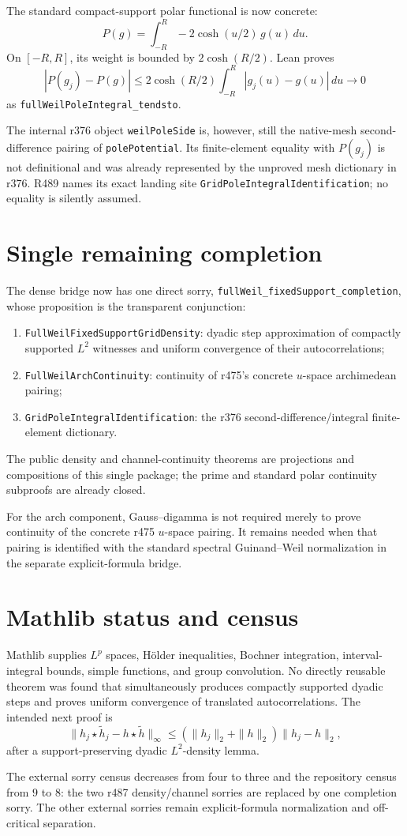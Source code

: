 \documentclass[11pt]{article}
\newcommand{\code}[1]{\nolinkurl{#1}}
\begin{document}
The standard compact-support polar functional is now concrete:
\[
 P(g)=\int_{-R}^{R}-2\cosh(u/2)\,g(u)\,du .
\]
On \([-R,R]\), its weight is bounded by
\(2\cosh(R/2)\).  Lean proves
\[
 |P(g_j)-P(g)|\le
 2\cosh(R/2)\int_{-R}^{R}|g_j(u)-g(u)|\,du
 \longrightarrow0
\]
as \code{fullWeilPoleIntegral_tendsto}.

The internal r376 object \code{weilPoleSide} is, however, still the
native-mesh second-difference pairing of \code{polePotential}.  Its
finite-element equality with \(P(g_j)\) is not definitional and was
already represented by the unproved mesh dictionary in r376.  R489
names its exact landing site
\code{GridPoleIntegralIdentification}; no equality is silently assumed.

\section{Single remaining completion}

The dense bridge now has one direct sorry,
\code{fullWeil_fixedSupport_completion}, whose proposition is the
transparent conjunction:
\begin{enumerate}
\item \code{FullWeilFixedSupportGridDensity}: dyadic step approximation
of compactly supported \(L^2\) witnesses and uniform convergence of
their autocorrelations;
\item \code{FullWeilArchContinuity}: continuity of r475's concrete
\(u\)-space archimedean pairing;
\item \code{GridPoleIntegralIdentification}: the r376
second-difference/integral finite-element dictionary.
\end{enumerate}
The public density and channel-continuity theorems are projections and
compositions of this single package; the prime and standard polar
continuity subproofs are already closed.

For the arch component, Gauss--digamma is not required merely to prove
continuity of the concrete r475 \(u\)-space pairing.  It remains needed
when that pairing is identified with the standard spectral
Guinand--Weil normalization in the separate explicit-formula bridge.

\section{Mathlib status and census}

Mathlib supplies \(L^p\) spaces, Hölder inequalities, Bochner
integration, interval-integral bounds, simple functions, and group
convolution.  No directly reusable theorem was found that simultaneously
produces compactly supported dyadic steps and proves uniform convergence
of translated autocorrelations.  The intended next proof is
\[
\|h_j\star\widetilde h_j-h\star\widetilde h\|_\infty
\le(\|h_j\|_2+\|h\|_2)\|h_j-h\|_2,
\]
after a support-preserving dyadic \(L^2\)-density lemma.

The external sorry census decreases from four to three and the
repository census from \(9\) to \(8\): the two r487 density/channel
sorries are replaced by one completion sorry.  The other external
sorries remain explicit-formula normalization and off-critical
separation.
\end{document}
